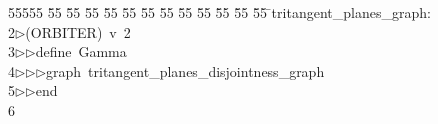 %
%
\begin{tabbing}
55555 \= 55 \= 55 \= 55 \= 55 \= 55 \= 55 \= 55 \= 55 \= 55 \= 55 \= 55 \= 55 \= \>tritangent\_planes\_graph:\\[0pt]
2\>$\triangleright$\>(ORBITER)\ v\ 2\ \\[0pt]
3\>$\triangleright$\>$\triangleright$\>define\ Gamma\ \\[0pt]
4\>$\triangleright$\>$\triangleright$\>$\triangleright$\>graph\ tritangent\_planes\_disjointness\_graph\ \\[0pt]
5\>$\triangleright$\>$\triangleright$\>end\\[0pt]
6\>\end{tabbing}
